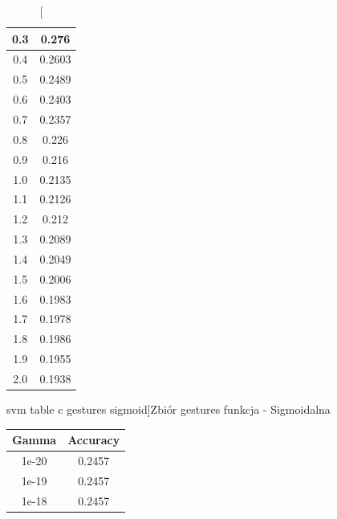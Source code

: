 \documentclass{classrep}
\begin{document}
{{\begin{table}[!htbp]
\begin{minipage}{.3\textwidth}
\begin{tabular}{|c|c|}
                        0.3 & 0.276 \\ \hline
                        0.4 & 0.2603 \\ \hline
                        0.5 & 0.2489 \\ \hline
                        0.6 & 0.2403 \\ \hline
                        0.7 & 0.2357 \\ \hline
                        0.8 & 0.226 \\ \hline
                        0.9 & 0.216 \\ \hline
                        1.0 & 0.2135 \\ \hline
                        1.1 & 0.2126 \\ \hline
                        1.2 & 0.212 \\ \hline
                        1.3 & 0.2089 \\ \hline
                        1.4 & 0.2049 \\ \hline
                        1.5 & 0.2006 \\ \hline
                        1.6 & 0.1983 \\ \hline
                        1.7 & 0.1978 \\ \hline
                        1.8 & 0.1986 \\ \hline
                        1.9 & 0.1955 \\ \hline
                        2.0 & 0.1938 \\ \hline
                    \end{tabular}
                    \caption
                    [svm table c gestures sigmoid]{Zbiór gestures funkcja - Sigmoidalna}
                    \label{svm_table_c_gestures_sigmoid}
                \end{minipage}
            \end{table}
            \FloatBarrier
            \begin{table}[!htbp]
                \begin{minipage}{.35\textwidth}
                    \centering
                    \begin{tabular}{|c|c|}
                        \hline
                        Gamma & Accuracy \\ \hline
                        1e-20 & 0.2457 \\ \hline
                        1e-19 & 0.2457 \\ \hline
                        1e-18 & 0.2457 \\ \hline

\end{tabular}
\end{minipage}
\end{table}}}
\end{document}
